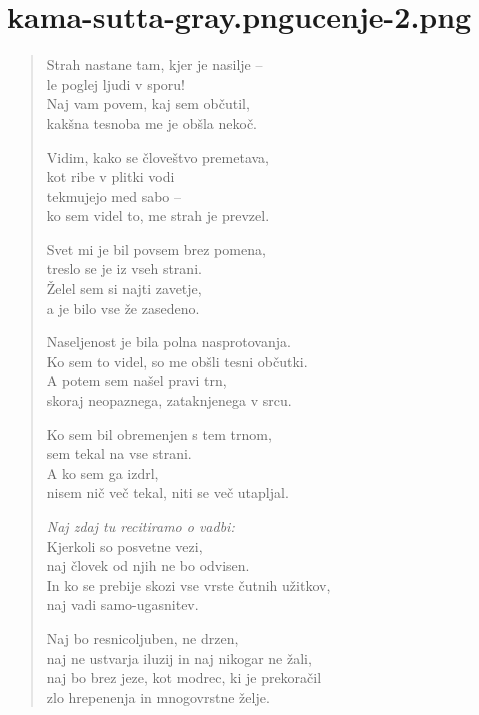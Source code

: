 
\chapter[Attadaṇḍa Sutta]{{kama-sutta-gray.png}{ucenje-2.png}}

\begin{verse}


Strah nastane tam, kjer je nasilje --\\
le poglej ljudi v sporu!\\
Naj vam povem, kaj sem občutil,\\
kakšna tesnoba me je obšla nekoč.

Vidim, kako se človeštvo premetava,\\
kot ribe v plitki vodi\\
tekmujejo med sabo --\\
ko sem videl to, me strah je prevzel.

Svet mi je bil povsem brez pomena,\\
treslo se je iz vseh strani.\\
Želel sem si najti zavetje,\\
a je bilo vse že zasedeno.

Naseljenost je bila polna nasprotovanja.\\
Ko sem to videl, so me obšli tesni občutki.\\
A potem sem našel pravi trn,\\
skoraj neopaznega, zataknjenega v srcu.

Ko sem bil obremenjen s tem trnom,\\
sem tekal na vse strani.\\
A ko sem ga izdrl,\\
nisem nič več tekal, niti se več utapljal.

\emph{Naj zdaj tu recitiramo o vadbi:}\\
Kjerkoli so posvetne vezi,\\
naj človek od njih ne bo odvisen.\\
In ko se prebije skozi vse vrste čutnih užitkov,\\
naj vadi samo-ugasnitev.

Naj bo resnicoljuben, ne drzen,\\
naj ne ustvarja iluzij in naj nikogar ne žali,\\
naj bo brez jeze, kot modrec, ki je prekoračil\\
zlo hrepenenja in mnogovrstne želje.


\end{verse}
